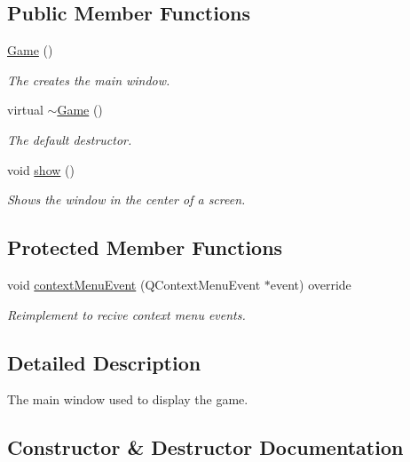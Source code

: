 \subsection*{Public Member Functions}
\begin{DoxyCompactItemize}
\item 
\mbox{\hyperlink{class_game_ad59df6562a58a614fda24622d3715b65}{Game}} ()
\begin{DoxyCompactList}\small\item\em The creates the main window. \end{DoxyCompactList}\item 
virtual \mbox{\hyperlink{class_game_ae3d112ca6e0e55150d2fdbc704474530}{$\sim$\+Game}} ()
\begin{DoxyCompactList}\small\item\em The default destructor. \end{DoxyCompactList}\item 
void \mbox{\hyperlink{class_game_ada0891dcd00cd18026915f7dfcdde2b6}{show}} ()
\begin{DoxyCompactList}\small\item\em Shows the window in the center of a screen. \end{DoxyCompactList}\end{DoxyCompactItemize}
\subsection*{Protected Member Functions}
\begin{DoxyCompactItemize}
\item 
void \mbox{\hyperlink{class_game_a4122fd61c61ca57ecbe4458f938e2f98}{context\+Menu\+Event}} (Q\+Context\+Menu\+Event $\ast$event) override
\begin{DoxyCompactList}\small\item\em Reimplement to recive context menu events. \end{DoxyCompactList}\end{DoxyCompactItemize}


\subsection{Detailed Description}
The main window used to display the game. 



\subsection{Constructor \& Destructor Documentation}
\mbox{\label{class_game_ad59df6562a58a614fda24622d3715b65}} 
